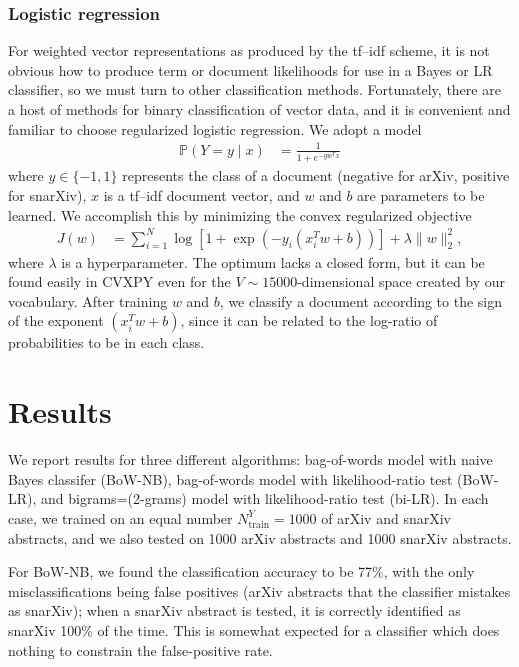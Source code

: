 \documentclass{article}
\renewcommand{\P}{\mathbb{P}}
\begin{document}
\subsubsection{Logistic regression}
For weighted vector representations as produced by the tf--idf scheme, it is not obvious how to produce term or document likelihoods for use in a Bayes or LR classifier, so we must turn to other classification methods. Fortunately, there are a host of methods for binary classification of vector data, and it is convenient and familiar to choose regularized logistic regression. We adopt a model
%
\begin{align}
  \P(Y=y \mid x) &= \frac{1}{1 + e^{-y w^T x}}
\end{align}
%
where $y \in \{-1, 1\}$ represents the class of a document (negative for arXiv, positive for snarXiv), $x$ is a tf--idf document vector, and $w$ and $b$ are parameters to be learned. We accomplish this by minimizing the convex regularized objective
%
\begin{align}
  J(w) &= \sum_{i=1}^N \log\left[1+ \exp\left(-y_i(x_i^T w + b)\right)\right] + \lambda \|w\|_2^2,
\end{align}
%
where $\lambda$ is a hyperparameter. The optimum lacks a closed form, but it can be found easily in CVXPY even for the $V \sim 15000$-dimensional space created by our vocabulary. After training $w$ and $b$, we classify a document according to the sign of the exponent $(x_i^T w + b)$, since it can be related to the log-ratio of probabilities to be in each class.







\section{Results}
We report results for three different algorithms: bag-of-words model with naive Bayes classifer (BoW-NB), bag-of-words model with likelihood-ratio test (BoW-LR), and bigrams=(2-grams) model with likelihood-ratio test (bi-LR).
In each case, we trained on an equal number $N_\text{train}^Y=1000$ of arXiv and snarXiv abstracts, and we also tested on 1000 arXiv abstracts and 1000 snarXiv abstracts.
%
%

For BoW-NB, we found the classification accuracy to be 77\%, with the only misclassifications being false positives (arXiv abstracts that the classifier mistakes as snarXiv); when a snarXiv abstract is tested, it is correctly identified as snarXiv 100\% of the time.
This is somewhat expected for a classifier which does nothing to constrain the false-positive rate.
\end{document}
